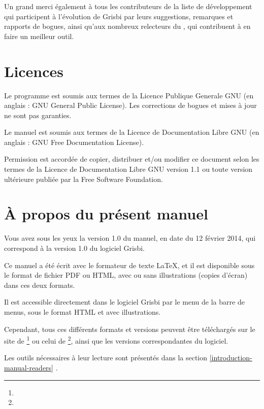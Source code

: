 Un grand merci également à tous les contributeurs de la liste de développement qui participent à l'évolution de Grisbi par leurs suggestions, remarques et rapports de bogues, ainsi qu'aux nombreux relecteurs du , qui contribuent à en faire un meilleur outil.


\section{Licences\label{introduction-licenses}}


Le programme est soumis aux termes de la \gls{Licence Publique Generale GNU}
(en anglais : \gls{GNU General Public License}). Les corrections de bogues et mises à jour ne sont pas garanties.

Le manuel est soumis aux termes de la \gls{Licence de Documentation Libre GNU} (en anglais : \gls{GNU Free Documentation License}).

Permission est accordée de copier, distribuer et/ou modifier ce document
selon les termes de la Licence de Documentation Libre GNU version 1.1 ou toute version ultérieure publiée par la \gls{Free Software Foundation}.


\section{À propos du présent manuel\label{introduction-manual}}


Vous avez sous les yeux la version \actuality{}1.0 du manuel, en date du \actuality{} 12 février 2014, qui correspond à la version 1.0 du logiciel Grisbi. 

Ce manuel a été écrit avec le \gls{formateur de texte} \gls{LaTeX}, et il est disponible sous le \gls{format de fichier} PDF ou HTML, avec ou sans illustrations (copies d'écran) dans ces deux formats. 

Il est accessible directement dans le logiciel Grisbi par le menu  de la barre de menus, sous le format HTML et avec illustrations.

Cependant, tous ces différents formats et versions peuvent être téléchargés sur le site de \footnote{\urlGrisbi{}} ou celui de \footnote{\urlSourceForgeDocumentation{}}, ainsi que les versions correspondantes du logiciel.

Les outils nécessaires à leur lecture sont présentés dans la section \vref{introduction-manual-readers} .


